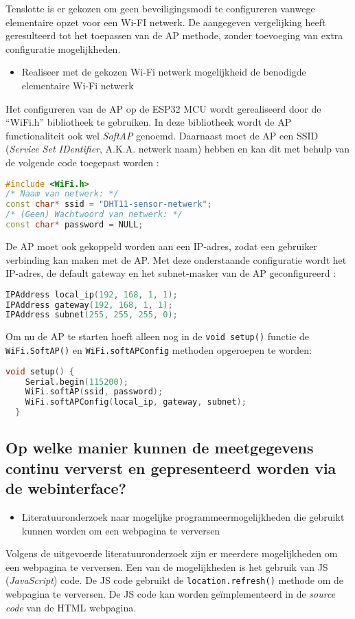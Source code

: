 Tenslotte is er gekozen om geen beveiligingsmodi te configureren vanwege elementaire opzet voor een Wi-FI netwerk. 
De aangegeven vergelijking heeft geresulteerd tot het toepassen van de AP methode, zonder toevoeging van extra configuratie mogelijkheden.
\begin{itemize}
    \item[\ding{226}] Realiseer met de gekozen Wi-Fi netwerk mogelijkheid de benodigde elementaire Wi-Fi netwerk
\end{itemize}
Het configureren van de AP op de ESP32 MCU wordt gerealiseerd door de ``WiFi.h'' bibliotheek te gebruiken. 
In deze bibliotheek wordt de AP functionaliteit ook wel \textit{SoftAP} genoemd. 
Daarnaast moet de AP een SSID (\textit{Service Set IDentifier}, A.K.A. netwerk naam) hebben en kan dit met behulp van de volgende code toegepast worden \cite{Charles2013}:
\begin{lstlisting}[language=C++]
#include <WiFi.h>
/* Naam van netwerk: */
const char* ssid = "DHT11-sensor-netwerk"; 
/* (Geen) Wachtwoord van netwerk: */
const char* password = NULL;
\end{lstlisting}
De AP moet ook gekoppeld worden aan een IP-adres, zodat een gebruiker verbinding kan maken met de AP. 
Met deze onderstaande configuratie wordt het IP-adres, de default gateway en het subnet-masker van de AP geconfigureerd \cite{upesy}:
\begin{lstlisting}[language=C++]
IPAddress local_ip(192, 168, 1, 1);
IPAddress gateway(192, 168, 1, 1);
IPAddress subnet(255, 255, 255, 0);
\end{lstlisting}
Om nu de AP te starten hoeft alleen nog in de \verb|void setup()| functie de \verb|WiFi.SoftAP()| en \verb|WiFi.softAPConfig| methoden opgeroepen te worden:
\begin{lstlisting}[language=C++]
void setup() {
    Serial.begin(115200);
    WiFi.softAP(ssid, password);
    WiFi.softAPConfig(local_ip, gateway, subnet);
  }
\end{lstlisting}
\subsection{Op welke manier kunnen de meetgegevens continu ververst en gepresenteerd worden via de webinterface?}
\label{MEET}
\begin{itemize}
    \item[\ding{226}] Literatuuronderzoek naar mogelijke programmeermogelijkheden die gebruikt kunnen worden om een webpagina te verversen
\end{itemize}
Volgens de uitgevoerde literatuuronderzoek \cite{Lau2020} zijn er meerdere mogelijkheden om een webpagina te verversen. 
Een van de mogelijkheden is het gebruik van JS (\textit{JavaScript}) code. 
De JS code gebruikt de \verb|location.refresh()| methode om de webpagina te verversen.
De JS code kan worden geïmplementeerd in de \textit{source code} van de HTML webpagina. 

